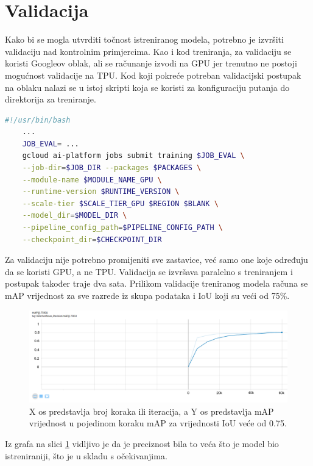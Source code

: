 \section{Validacija}
Kako bi se mogla utvrditi točnost istreniranog modela, potrebno je izvršiti validaciju nad kontrolnim primjercima. Kao i kod treniranja, za validaciju se koristi Googleov oblak, ali se računanje izvodi
na GPU jer trenutno ne postoji mogućnost validacije na TPU. Kod koji pokreće potreban validacijski postupak na oblaku nalazi se u istoj skripti koja se koristi za konfiguraciju putanja do direktorija za treniranje.

\begin{lstlisting}[language=bash, tabsize=2]
    #!/usr/bin/bash
    ...
    JOB_EVAL= ...
    gcloud ai-platform jobs submit training $JOB_EVAL \
    --job-dir=$JOB_DIR --packages $PACKAGES \
    --module-name $MODULE_NAME_GPU \
    --runtime-version $RUNTIME_VERSION \
    --scale-tier $SCALE_TIER_GPU $REGION $BLANK \
    --model_dir=$MODEL_DIR \
    --pipeline_config_path=$PIPELINE_CONFIG_PATH \
    --checkpoint_dir=$CHECKPOINT_DIR
\end{lstlisting}

Za validaciju nije potrebno promijeniti sve zastavice, već samo one koje određuju da se koristi GPU, a ne TPU. Validacija se izvršava paralelno s treniranjem i postupak također traje dva sata.
Prilikom validacije treniranog modela računa se mAP vrijednost za sve razrede iz skupa podataka i IoU koji su veći od 75\%. \newline

\begin{figure}[htb]
    \centering
    \includegraphics[width=14cm]{img/eval-mAP.png}
    \caption{X os predstavlja broj koraka ili iteracija, a Y os predstavlja mAP vrijednost u pojedinom koraku mAP za vrijednosti IoU veće od 0.75.}
    \label{Eval-mAP}
\end{figure}


Iz grafa na slici \ref{Eval-mAP} vidljivo je da je preciznost bila to veća što je model bio istreniraniji, što je u skladu s očekivanjima. 

